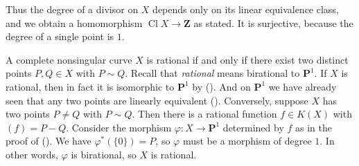 {Thus the degree of a divisor on $X$ depends only on its linear equivalence class, and we obtain a homomorphism $\operatorname{Cl}X\to\mathbf Z$ as stated. It is surjective, because the degree of a single point is $1$.

 A complete nonsingular curve $X$ is rational if and only if there exist two distinct points $P,Q\in X$ with $P\sim Q$. Recall that \emph{rational} means birational to $\mathbf P^1$. If $X$ is rational, then in fact it is isomorphic to $\mathbf P^1$ by (). And on $\mathbf P^1$ we have already seen that any two points are linearly equivalent (). Conversely, suppose $X$ has two points $P\ne Q$ with $P\sim Q$. Then there is a rational function $f\in K(X)$ with $(f)=P-Q$. Consider the morphism $\varphi\colon X\to\mathbf P^1$ determined by $f$ as in the proof of (). We have $\varphi^*(\{0\})=P$, so $\varphi$ must be a morphism of degree $1$. In other words, $\varphi$ is birational, so $X$ is rational.
}
